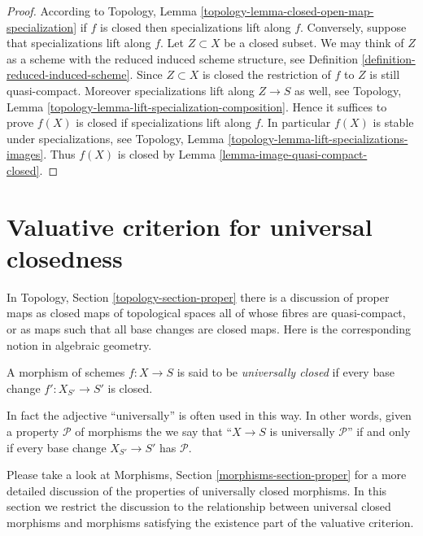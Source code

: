 \begin{proof}
According to
Topology, Lemma \ref{topology-lemma-closed-open-map-specialization}
if $f$ is closed then specializations lift along $f$.
Conversely, suppose that specializations lift along $f$.
Let $Z \subset X$ be a closed subset. We may think of $Z$
as a scheme with the reduced induced scheme structure, see
Definition \ref{definition-reduced-induced-scheme}.
Since $Z \subset X$ is closed the restriction
of $f$ to $Z$ is still quasi-compact. Moreover specializations lift
along $Z \to S$ as well,
see Topology, Lemma \ref{topology-lemma-lift-specialization-composition}.
Hence it suffices to prove $f(X)$ is closed if specializations lift along $f$.
In particular $f(X)$ is stable under specializations, see
Topology, Lemma \ref{topology-lemma-lift-specializations-images}.
Thus $f(X)$ is closed by
Lemma \ref{lemma-image-quasi-compact-closed}.
\end{proof}










\section{Valuative criterion for universal closedness}
\label{section-valuative-criterion-universal-closedness}

\noindent
In Topology, Section \ref{topology-section-proper} there is a
discussion of proper maps as closed maps of topological spaces
all of whose fibres are quasi-compact, or as maps such that
all base changes are closed maps. Here is the corresponding notion
in algebraic geometry.

\begin{definition}
\label{definition-universally-closed}
A morphism of schemes $f : X \to S$ is said to be
{\it universally closed} if every base change
$f' : X_{S'} \to S'$ is closed.
\end{definition}

\noindent
In fact the adjective ``universally'' is often used in this way.
In other words, given a property $\mathcal{P}$ of morphisms
the we say that ``$X \to S$ is universally $\mathcal{P}$''
if and only if every base change $X_{S'} \to S'$ has $\mathcal{P}$.

\medskip\noindent
Please take a look at Morphisms, Section \ref{morphisms-section-proper} for a
more detailed discussion of the properties of universally closed morphisms.
In this section we restrict the discussion to the relationship between
universal closed morphisms and morphisms satisfying the
existence part of the valuative criterion.

